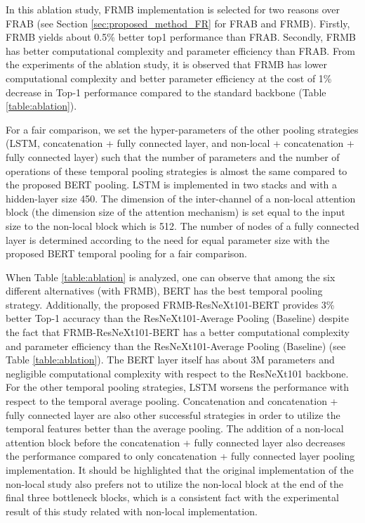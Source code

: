 \documentclass[runningheads]{llncs}
\begin{document}
In this ablation study, FRMB implementation is selected for two reasons over FRAB (see Section \ref{sec:proposed_method_FR} for FRAB and FRMB). Firstly, FRMB yields about 0.5\% better top1 performance than FRAB. Secondly, FRMB has better computational complexity and parameter efficiency than FRAB. From the experiments of the ablation study, it is observed that FRMB has lower computational complexity and better parameter efficiency at the cost of 1\% decrease in Top-1 performance compared to the standard backbone (Table \ref{table:ablation}).

For a fair comparison, we set the hyper-parameters of the other pooling strategies (LSTM, concatenation + fully connected layer, and non-local + concatenation + fully connected layer) such that the number of parameters and the number of operations of these temporal pooling strategies is almost the same compared to the proposed BERT pooling. LSTM is implemented in two stacks and with a hidden-layer size 450. The dimension of the inter-channel of a non-local attention block (the dimension size of the attention mechanism) is set equal to the input size to the non-local block which is 512. The number of nodes of a fully connected layer is determined according to the need for equal parameter size with the proposed BERT temporal pooling for a fair comparison. 


When Table \ref{table:ablation} is analyzed, one can observe that among the six different alternatives (with FRMB), BERT has the best temporal pooling strategy. Additionally, the proposed FRMB-ResNeXt101-BERT provides 3\% better Top-1 accuracy than the ResNeXt101-Average Pooling (Baseline) despite the fact that FRMB-ResNeXt101-BERT has a better computational complexity and parameter efficiency than the ResNeXt101-Average Pooling (Baseline) (see Table \ref{table:ablation}). The BERT layer itself has about 3M parameters and negligible computational complexity with respect to the ResNeXt101 backbone. For the other temporal pooling strategies, LSTM worsens the performance with respect to the temporal average pooling. Concatenation and concatenation + fully connected layer are also other successful strategies in order to utilize the temporal features better than the average pooling. The addition of a non-local attention block before the concatenation + fully connected layer also decreases the performance compared to only concatenation + fully connected layer pooling implementation. It should be highlighted that the original implementation of the non-local study \cite{Wang2018a} also prefers not to utilize the non-local block at the end of the final three bottleneck blocks, which is a consistent fact with the experimental result of this study related with non-local implementation. 
\end{document}
